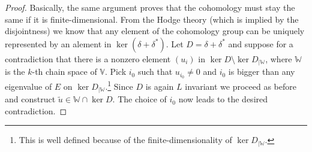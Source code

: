 \begin{proof}
Basically, the same argument proves that the cohomology must stay the same if it is finite-dimensional. From the Hodge theory (which is implied by the disjointness) we know that any element of the cohomology group can be uniquely represented by an alement in $\ker (\delta + \delta^*)$. Let $D=\delta + \delta^*$ and suppose for a contradiction that there is a nonzero element $(u_i)$ in $\ker D \setminus \ker D_{|\mathbb{W}}$, where $\mathbb{W}$ is the $k$-th chain space of $\mathbb{V}$. Pick $i_0$ such that $u_{i_0} \neq 0$ and $i_0$ is bigger than any eigenvalue of $E$ on $\ker D_{|\mathbb{W}}$.\footnote{This is well defined because of the finite-dimensionality of $\ker D_{|\mathbb{W}}$.} Since $D$ is again $L$ invariant we proceed as before and construct $\widetilde{u}\in\mathbb{W}\cap\ker D$. The choice of $i_0$ now leads to the desired contradiction.

\end{proof}


